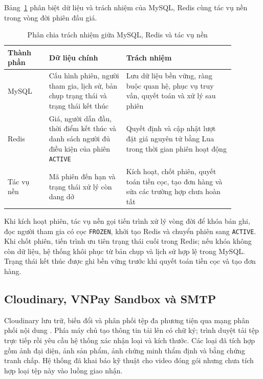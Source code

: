 \documentclass[../DoAn.tex]{subfiles}
\begin{document}
Bảng~\ref{tab:chapter3-storage-responsibility} phân biệt dữ liệu và trách nhiệm của MySQL, Redis cùng tác vụ nền trong vòng đời phiên đấu giá.

\begin{table}[htbp]
    \centering
    \caption{Phân chia trách nhiệm giữa MySQL, Redis và tác vụ nền}
    \label{tab:chapter3-storage-responsibility}
    \small
    \renewcommand{\arraystretch}{1.2}
    \begin{tabular}{|>{\raggedright\arraybackslash}p{0.16\linewidth}|>{\raggedright\arraybackslash}p{0.30\linewidth}|>{\raggedright\arraybackslash}p{0.42\linewidth}|}
        \hline
        \textbf{Thành phần} & \textbf{Dữ liệu chính} & \textbf{Trách nhiệm} \\ \hline
        MySQL & Cấu hình phiên, người tham gia, lịch sử, bản chụp trạng thái và trạng thái kết thúc & Lưu dữ liệu bền vững, ràng buộc quan hệ, phục vụ truy vấn, quyết toán và xử lý sau phiên \\ \hline
        Redis & Giá, người dẫn đầu, thời điểm kết thúc và danh sách người đủ điều kiện của phiên \texttt{ACTIVE} & Quyết định và cập nhật lượt đặt giá nguyên tử bằng Lua trong thời gian phiên hoạt động \\ \hline
        Tác vụ nền & Mã phiên đến hạn và trạng thái xử lý còn dang dở & Kích hoạt, chốt phiên, quyết toán tiền cọc, tạo đơn hàng và sửa các trường hợp chưa hoàn tất \\ \hline
    \end{tabular}
\end{table}

Khi kích hoạt phiên, tác vụ nền gọi tiến trình xử lý vòng đời để khóa bản ghi, đọc người tham gia có cọc \texttt{FROZEN}, khởi tạo Redis và chuyển phiên sang \texttt{ACTIVE}. Khi chốt phiên, tiến trình ưu tiên trạng thái cuối trong Redis; nếu khóa không còn dữ liệu, hệ thống khôi phục từ bản chụp và lịch sử hợp lệ trong MySQL. Trạng thái kết thúc được ghi bền vững trước khi quyết toán tiền cọc và tạo đơn hàng.

\subsection{Cloudinary, VNPay Sandbox và SMTP}

Cloudinary lưu trữ, biến đổi và phân phối tệp đa phương tiện qua mạng phân phối nội dung \cite{cloudinarydocs}. Phía máy chủ tạo thông tin tải lên có chữ ký; trình duyệt tải tệp trực tiếp rồi yêu cầu hệ thống xác nhận loại và kích thước. Các loại đã tích hợp gồm ảnh đại diện, ảnh sản phẩm, ảnh chứng minh thẩm định và bằng chứng tranh chấp. Hệ thống đã khai báo kỹ thuật cho video đóng gói nhưng chưa tích hợp loại tệp này vào luồng giao nhận.
\end{document}
